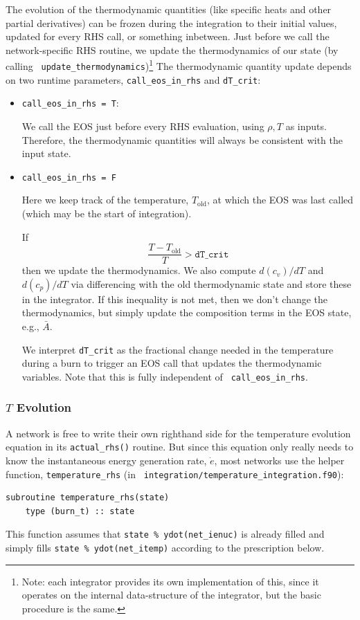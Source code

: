 The evolution of the thermodynamic quantities (like specific heats and
other partial derivatives) can be frozen during the integration to
their initial values, updated for every RHS call, or something
inbetween.  Just before we call the network-specific RHS routine, we
update the thermodynamics of our state (by calling {\tt
  update\_thermodynamics})\footnote{Note: each integrator provides its
  own implementation of this, since it operates on the internal
  data-structure of the integrator, but the basic procedure is the
  same.}  The thermodynamic quantity update depends on two runtime
parameters, {\tt call\_eos\_in\_rhs} and {\tt dT\_crit}:
\begin{itemize}
\item {\tt call\_eos\_in\_rhs = T}:

  We call the EOS just before every RHS evaluation, using $\rho, T$ as
  inputs.  Therefore, the thermodynamic quantities will always be
  consistent with the input state.  

\item {\tt call\_eos\_in\_rhs = F} 
  
  Here we keep track of the temperature, $T_\mathrm{old}$, at 
  which the EOS was last called (which may be the start of integration).
  
  If
  \begin{equation}
    \frac{T - T_\mathrm{old}}{T} > \mathtt{dT\_crit}
    \end{equation}
  then we update the thermodynamics.  We also compute $d(c_v)/dT$ and
  $d(c_p)/dT$ via differencing with the old thermodynamic state and
  store these in the integrator.  If this inequality is not met, then
  we don't change the thermodynamics, but simply update the
  composition terms in the EOS state, e.g., $\bar{A}$.

We interpret {\tt dT\_crit} as the fractional change needed in the
temperature during a burn to trigger an EOS call that updates the
thermodynamic variables.  Note that this is fully independent of {\tt
  call\_eos\_in\_rhs}.  

\end{itemize}



\subsubsection{$T$ Evolution}

A network is free to write their own righthand side for the
temperature evolution equation in its {\tt actual\_rhs()} routine.
But since this equation only really needs to know the instantaneous
energy generation rate, $\dot{e}$, most networks use the helper
function, {\tt temperature\_rhs} (in {\tt
  integration/temperature\_integration.f90}):
\begin{lstlisting}[language={[95]fortran}]
  subroutine temperature_rhs(state)
    type (burn_t) :: state
\end{lstlisting}
This function assumes that {\tt state \% ydot(net\_ienuc)} is already
filled and simply fills {\tt state \% ydot(net\_itemp)} according to
the prescription below.


